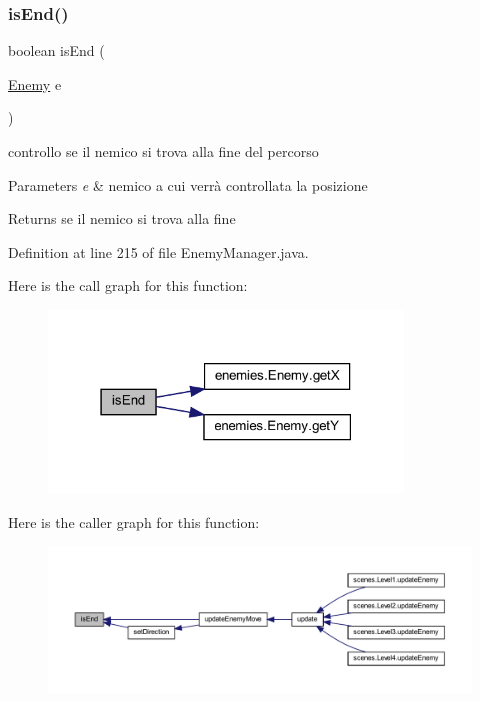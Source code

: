 \subsubsection{\texorpdfstring{is\+End()}{isEnd()}}
{\footnotesize\ttfamily boolean is\+End (\begin{DoxyParamCaption}\item[{\hyperlink{classenemies_1_1_enemy}{Enemy}}]{e }\end{DoxyParamCaption})\hspace{0.3cm}{\ttfamily [private]}}



controllo se il nemico si trova alla fine del percorso 


\begin{DoxyParams}{Parameters}
{\em e} & nemico a cui verrà controllata la posizione\\
\hline
\end{DoxyParams}
\begin{DoxyReturn}{Returns}
se il nemico si trova alla fine 
\end{DoxyReturn}


Definition at line 215 of file Enemy\+Manager.\+java.

Here is the call graph for this function\+:\nopagebreak
\begin{figure}[H]
\begin{center}
\leavevmode
\includegraphics[width=267pt]{classmanagers_1_1_enemy_manager_afec98871c0e021759b9d0afc8b690a18_cgraph}
\end{center}
\end{figure}
Here is the caller graph for this function\+:
\nopagebreak
\begin{figure}[H]
\begin{center}
\leavevmode
\includegraphics[width=350pt]{classmanagers_1_1_enemy_manager_afec98871c0e021759b9d0afc8b690a18_icgraph}
\end{center}
\end{figure}
\mbox{\label{classmanagers_1_1_enemy_manager_a774aefe7ec0626eb37d65a2335eade3b}} 
